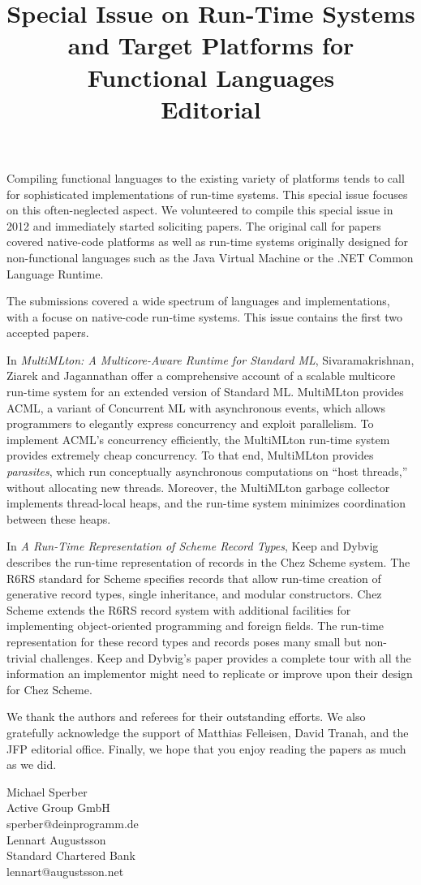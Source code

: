 \documentclass{jfp1}
\title[Special Issue on Run-Time Systems and Target Platforms for Functional Languages]
      {Special Issue on Run-Time Systems and Target Platforms for Functional Languages \\
Editorial}
\begin{document}
\maketitle

\noindent Compiling functional languages to the existing variety of platforms tends to call 
for sophisticated implementations of run-time systems. This special issue focuses 
on this often-neglected aspect.  
We volunteered to compile this special issue in 2012 and immediately
started soliciting papers.  The
original call for papers covered native-code platforms as well as
run-time systems originally designed for non-functional languages
such as the Java Virtual Machine or the .NET Common Language Runtime.

The submissions covered a wide spectrum of languages and implementations,
with a focuse on native-code run-time systems.  This issue contains the
first two accepted papers.

In \textit{MultiMLton: A Multicore-Aware Runtime for Standard ML},
Sivaramakrishnan, Ziarek and Jagannathan offer a comprehensive account of a
scalable multicore run-time system for an extended version of Standard ML.
MultiMLton provides ACML, a variant of Concurrent ML with asynchronous
events, which allows programmers to elegantly express concurrency and
exploit parallelism.  To implement ACML's concurrency efficiently, the
MultiMLton run-time system provides extremely cheap concurrency.  To that
end, MultiMLton provides \textit{parasites}, which run conceptually
asynchronous computations on ``host threads,'' without allocating new
threads.  Moreover, the MultiMLton garbage collector implements
thread-local heaps, and the run-time system minimizes coordination between
these heaps.

In \textit{A Run-Time Representation of Scheme Record Types}, Keep and
Dybvig describes the run-time representation
of records in the Chez Scheme system.  
The R6RS standard for Scheme specifies records that allow run-time creation of
generative record types, single inheritance, and modular
constructors. Chez Scheme extends the R6RS record
system with additional facilities for implementing object-oriented programming
and foreign fields.  The run-time representation for these record types and
records poses many small but non-trivial challenges. Keep and Dybvig's paper
provides a complete tour with all the information an implementor might
need to replicate or improve upon their design for Chez Scheme.

We thank the authors and referees for their outstanding efforts.  We also gratefully
acknowledge the support of Matthias Felleisen, David Tranah, and the JFP editorial
office.  Finally, we hope that you enjoy
reading the papers as much as we did.


\begin{flushright}
 Michael Sperber\\
  Active Group GmbH\\
  sperber@deinprogramm.de\\[2mm]
  Lennart Augustsson\\
  Standard Chartered Bank\\
  lennart@augustsson.net
\end{flushright}
\end{document}
